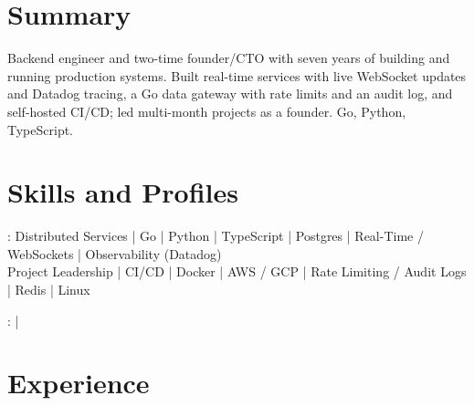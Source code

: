 \documentclass[print]{jack-resume}
\begin{document}
\pagecolor{darkmodeBackground}


\begin{minipage}[t][1cm][t]{.03\textwidth}
    \hfill
\end{minipage}

\section{Summary}
Backend engineer and two-time founder/CTO with seven years of building and running production systems. Built real-time services with live WebSocket updates and Datadog tracing, a Go data gateway with rate limits and an audit log, and self-hosted CI/CD; led multi-month projects as a founder. Go, Python, TypeScript.
\sectionsep

\section{Skills and Profiles}
:
Distributed Services \hfill | \hfill
Go \hfill | \hfill
Python \hfill | \hfill
TypeScript \hfill | \hfill
Postgres \hfill | \hfill
Real-Time / WebSockets \hfill | \hfill
Observability (Datadog) \\
\hspace{1.0cm} Project Leadership \hfill | \hfill
CI/CD \hfill | \hfill
Docker \hfill | \hfill
AWS / GCP \hfill | \hfill
Rate Limiting / Audit Logs \hfill | \hfill
Redis \hfill | \hfill
Linux \\

\raggedright{
    :
      \href{https://www.linkedin.com/in/jack-sturtevant/}{ \ExternalLink} |
     \href{https://github.com/jacksturt}{ \ExternalLink}}

\section{Experience}
\end{document}

